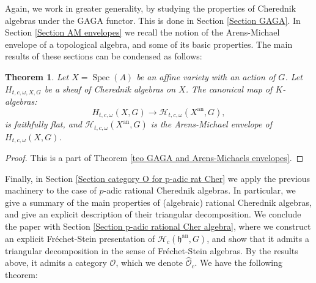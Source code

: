 \documentclass{amsart}
\newtheorem{intteo}{Theorem}
\newcommand{\OX}{\mathcal{O}}
\newcommand{\Spec}{\operatorname{Spec}}
\begin{document}
Again, we work in greater generality, by studying the properties of Cherednik algebras under the GAGA functor. This is done in Section \ref{Section GAGA}. In Section \ref{Section AM envelopes} we recall the notion of the Arens-Michael envelope of a topological algebra, and some of its basic properties. The main results of these sections can be condensed as follows:
\begin{intteo}
Let $X=\Spec(A)$ be an affine variety with an action of $G$. Let $H_{t,c,\omega,X,G}$ be a sheaf of Cherednik algebras on $X$. The canonical map of $K$-algebras:
\begin{equation*}
    H_{t,c,\omega}(X,G)\rightarrow \mathcal{H}_{t,c,\omega}(X^{\operatorname{an}},G),
\end{equation*}
is faithfully flat, and 
$\mathcal{H}_{t,c,\omega}(X^{\operatorname{an}},G)$ is the Arens-Michael envelope of $H_{t,c,\omega}(X,G)$.    
\end{intteo}
\begin{proof}
  This is a part of Theorem \ref{teo GAGA and Arens-Michaels envelopes}.  
\end{proof}
Finally, in Section \ref{Section category O for p-adic rat Cher}
we apply the previous machinery to the case of $p$-adic rational Cherednik algebras. In particular, we give a summary of the main properties of (algebraic) rational Cherednik algebras, and give an explicit description of their triangular decomposition. We conclude the paper  with Section \ref{Section p-adic rational Cher algebra}, where we construct an explicit Fréchet-Stein presentation of $\mathcal{H}_c(\mathfrak{h}^{\operatorname{an}},G)$, and show that it admits a triangular decomposition in the sense of Fréchet-Stein algebras. By the results above, it admits a category $\OX$, which we denote $\wideparen{\OX}_c$. We have the following theorem:
\end{document}
